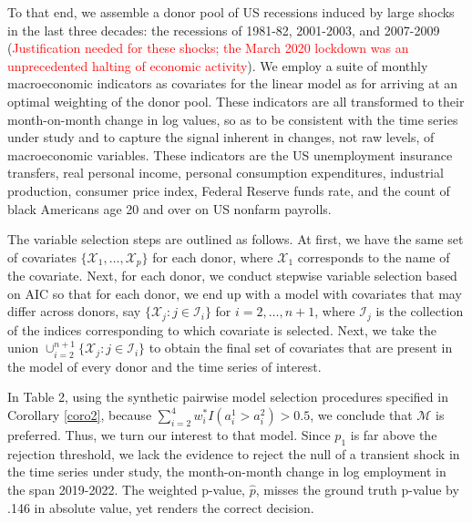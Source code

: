 \documentclass[11pt]{article}
\def\mc#1{\mathcal{#1}} %
\def\mc#1{\mathcal{#1}}
\theoremstyle{definition}
\begin{document}
To that end, we assemble a donor pool of US recessions induced by large shocks in the last three decades: the recessions of 1981-82, 2001-2003, and 2007-2009 (\textcolor{red}{Justification needed for these shocks; the March 2020 lockdown was an unprecedented halting of economic activity}).  We employ a suite of monthly macroeconomic indicators as covariates for the linear model as for arriving at an optimal weighting of the donor pool.  These indicators are all transformed to their month-on-month change in log values, so as to be consistent with the time series under study and to capture the signal inherent in changes, not raw levels, of macroeconomic variables.  These indicators are the US unemployment insurance transfers, real personal income, personal consumption expenditures, industrial production, consumer price index, Federal Reserve funds rate, and the count of black Americans age 20 and over on US nonfarm payrolls.


The variable selection steps are outlined as follows. At first, we have the same set of covariates $\{\mc{X}_1, \ldots, \mc{X}_p\}$ for each donor, where $\mc{X}_1$ corresponds to the name of the covariate. Next, for each donor, we conduct stepwise variable selection based on AIC so that for each donor, we end up with a model with covariates that may differ across  donors, say $\{\mc{X}_j \colon j\in \mc{I}_i\}$ for $i = 2, \ldots, n+1$, where $\mc{I}_j$ is the collection of the indices corresponding to which covariate is selected. Next, we  take the union $\cup_{i=2}^{n+1}\{\mc{X}_j \colon j\in \mc{I}_i\}$ to obtain the final set of covariates that are present in the model of every donor and the time series of interest.

In Table 2, using the synthetic pairwise model selection procedures specified in Corollary \ref{coro2}, because $\sum_{i=2}^4 w_i^* I(a_i^1 > a_i^2)>0.5$,  we conclude that  $\mc{M}$ is preferred. Thus, we turn our interest to that model.  Since $p_{1}$ is far above the rejection threshold, we lack the evidence to reject the null of a transient shock in the time series under study, the month-on-month change in log employment in the span 2019-2022.  The weighted p-value, $\hat p $, misses the ground truth p-value by .146 in absolute value, yet renders the correct decision.
\end{document}

